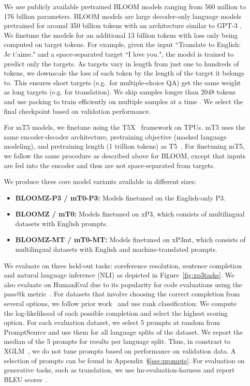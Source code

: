 \documentclass[11pt]{article}
\begin{document}
We use publicly available pretrained BLOOM models ranging from 560 million to 176 billion parameters. BLOOM models are large decoder-only language models pretrained for around 350 billion tokens with an architecture similar to GPT-3 \cite{gpt3}. We finetune the models for an additional 13 billion tokens with loss only being computed on target tokens. For example, given the input ``Translate to English: Je t'aime." and a space-separated target ``I love you.", the model is trained to predict only the targets. As targets vary in length from just one to hundreds of tokens, we downscale the loss of each token by the length of the target it belongs to. This ensures short targets (e.g.\ for multiple-choice QA) get the same weight as long targets (e.g. for translation). We skip samples longer than 2048 tokens and use packing to train efficiently on multiple samples at a time \cite{kosec2021packing}. We select the final checkpoint based on validation performance.

For mT5 models, we finetune using the T5X~\cite{roberts2022t5x} framework on TPUs. mT5 uses the same encoder-decoder architecture, pretraining objective (masked language modeling), and pretraining length (1 trillion tokens) as T5~\cite{raffel2020exploring}. For finetuning mT5, we follow the same procedure as described above for BLOOM, except that inputs are fed into the encoder and thus are not space-separated from targets. 

We produce three core model variants available in different sizes:

\begin{itemize}
    \item \textbf{BLOOMZ-P3 / mT0-P3:} Models finetuned on the English-only P3.
    \item \textbf{BLOOMZ / mT0:} Models finetuned on xP3, which consists of multilingual datasets with English prompts.
    \item \textbf{BLOOMZ-MT / mT0-MT:} Models finetuned on xP3mt, which consists of multilingual datasets with English and machine-translated prompts.
\end{itemize}

We evaluate on three held-out tasks: coreference resolution, sentence completion and natural language inference (NLI) as depicted in Figure~\ref{fig:xp3tasks}. We also evaluate on HumanEval due to its popularity for code evaluations using the pass@k metric~\cite{chen2021evaluating}. For datasets that involve choosing the correct completion from several options, we follow prior work~\cite{sanh2022multitask,gpt3} and use rank classification: We compute the log-likelihood of each possible completion and select the highest scoring option. For each evaluation dataset, we select 5 prompts at random from PromptSource and use them for all language splits of the dataset. We report the median of the 5 prompts for results per language split. Thus, in constrast to XGLM~\cite{lin2021few}, we do not tune prompts based on performance on validation data. A selection of prompts can be found in Appendix~\S\ref{sec:prompts}. For evaluation on generative tasks, such as translation, we use lm-evaluation-harness \cite{eval-harness} and report BLEU scores~\cite{papineni2002bleu}.
\end{document}
